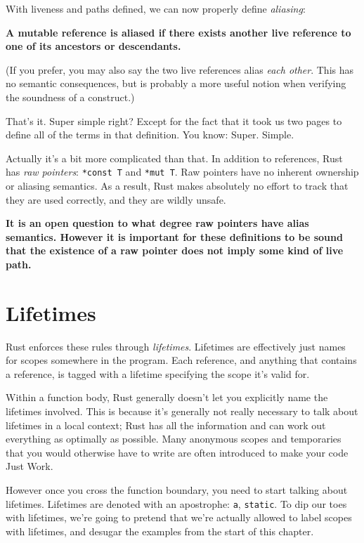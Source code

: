 \documentclass[a4paper,]{book}
\begin{document}
With liveness and paths defined, we can now properly define
\emph{aliasing}:

\textbf{A mutable reference is aliased if there exists another live
reference to one of its ancestors or descendants.}

(If you prefer, you may also say the two live references alias
\emph{each other}. This has no semantic consequences, but is probably a
more useful notion when verifying the soundness of a construct.)

That's it. Super simple right? Except for the fact that it took us two
pages to define all of the terms in that definition. You know: Super.
Simple.

Actually it's a bit more complicated than that. In addition to
references, Rust has \emph{raw pointers}: \texttt{*const\ T} and
\texttt{*mut\ T}. Raw pointers have no inherent ownership or aliasing
semantics. As a result, Rust makes absolutely no effort to track that
they are used correctly, and they are wildly unsafe.

\textbf{It is an open question to what degree raw pointers have alias
semantics. However it is important for these definitions to be sound
that the existence of a raw pointer does not imply some kind of live
path.}

\section{Lifetimes}\label{sec--lifetimes}

Rust enforces these rules through \emph{lifetimes}. Lifetimes are
effectively just names for scopes somewhere in the program. Each
reference, and anything that contains a reference, is tagged with a
lifetime specifying the scope it's valid for.

Within a function body, Rust generally doesn't let you explicitly name
the lifetimes involved. This is because it's generally not really
necessary to talk about lifetimes in a local context; Rust has all the
information and can work out everything as optimally as possible. Many
anonymous scopes and temporaries that you would otherwise have to write
are often introduced to make your code Just Work.

However once you cross the function boundary, you need to start talking
about lifetimes. Lifetimes are denoted with an apostrophe:
\texttt{\textquotesingle{}a}, \texttt{\textquotesingle{}static}. To dip
our toes with lifetimes, we're going to pretend that we're actually
allowed to label scopes with lifetimes, and desugar the examples from
the start of this chapter.
\end{document}
